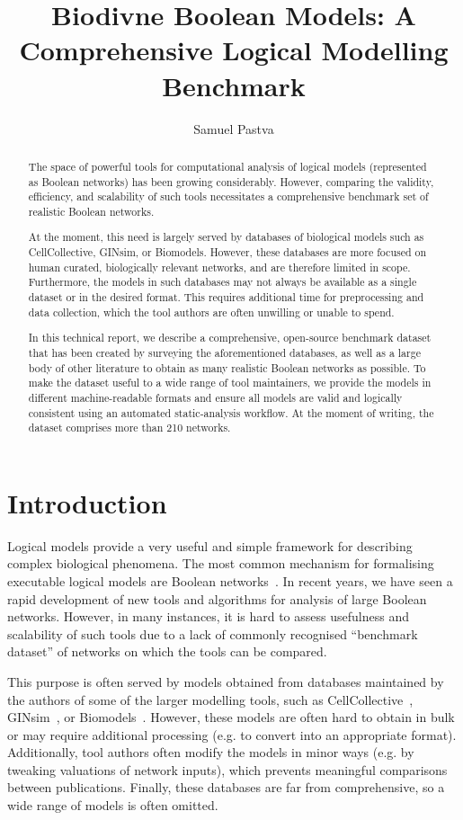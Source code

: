\documentclass{article}
\title{Biodivne Boolean Models: A Comprehensive Logical Modelling Benchmark}
\author{Samuel Pastva}
\date{}
\begin{document}
\maketitle

\begin{abstract}
	The space of powerful tools for computational analysis of logical models (represented as Boolean networks) has been growing considerably. However, comparing the validity, efficiency, and scalability of such tools necessitates a comprehensive benchmark set of realistic Boolean networks.
	
	At the moment, this need is largely served by databases of biological models such as CellCollective, GINsim, or Biomodels. However, these databases are more focused on human curated, biologically relevant networks, and are therefore limited in scope. Furthermore, the models in such databases may not always be available as a single dataset or in the desired format. This requires additional time for preprocessing and data collection, which the tool authors are often unwilling or unable to spend.
	
	In this technical report, we describe a comprehensive, open-source benchmark dataset that has been created by surveying the aforementioned databases, as well as a large body of other literature to obtain as many realistic Boolean networks as possible. To make the dataset useful to a wide range of tool maintainers, we provide the models in different machine-readable formats and ensure all models are valid and logically consistent using an automated static-analysis workflow. At the moment of writing, the dataset comprises more than 210 networks.
\end{abstract}

\section{Introduction}

Logical models provide a very useful and simple framework for describing complex biological phenomena. The most common mechanism for formalising executable logical models are Boolean networks~\cite{bn-intro}. In recent years, we have seen a rapid development of new tools and algorithms for analysis of large Boolean networks. However, in many instances, it is hard to assess usefulness and scalability of such tools due to a lack of commonly recognised ``benchmark dataset'' of networks on which the tools can be compared.

This purpose is often served by models obtained from databases maintained by the authors of some of the larger modelling tools, such as CellCollective~\cite{cell-collective}, GINsim~\cite{ginsim}, or Biomodels~\cite{biomodels}. However, these models are often hard to obtain in bulk or may require additional processing (e.g. to convert into an appropriate format). Additionally, tool authors often modify the models in minor ways (e.g. by tweaking valuations of network inputs), which prevents meaningful comparisons between publications. Finally, these databases are far from comprehensive, so a wide range of models is often omitted.
\end{document}
